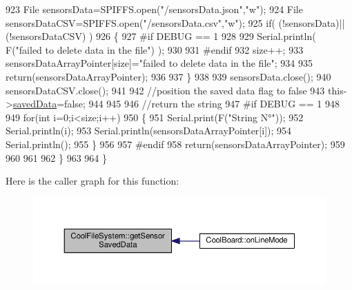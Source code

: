 \begin{DoxyCode}
923         File sensorsData=SPIFFS.open(\textcolor{stringliteral}{"/sensorsData.json"},\textcolor{stringliteral}{"w"});
924         File sensorsDataCSV=SPIFFS.open(\textcolor{stringliteral}{"/sensorsData.csv"},\textcolor{stringliteral}{"w"});
925         \textcolor{keywordflow}{if}( (!sensorsData)||(!sensorsDataCSV) ) 
926         \{
927 \textcolor{preprocessor}{        #if DEBUG == 1}
928     
929             Serial.println( F(\textcolor{stringliteral}{"failed to delete data in the file"}) );
930     
931 \textcolor{preprocessor}{        #endif}
932             size++;
933             sensorsDataArrayPointer[size]=\textcolor{stringliteral}{"failed to delete data in the file"};
934 
935             \textcolor{keywordflow}{return}(sensorsDataArrayPointer);
936 
937         \}
938 
939         sensorsData.close();
940         sensorsDataCSV.close();
941 
942         \textcolor{comment}{//position the saved data flag to false}
943         this->\hyperlink{classCoolFileSystem_ad398e0c5c41a0c88acdf5d672aa71351}{savedData}=\textcolor{keyword}{false}; 
944         
945 
946         \textcolor{comment}{//return the string}
947 \textcolor{preprocessor}{        #if DEBUG == 1}
948         
949             \textcolor{keywordflow}{for}(\textcolor{keywordtype}{int} i=0;i<size;i++)
950             \{
951                 Serial.print(F(\textcolor{stringliteral}{"String N°"}));
952                 Serial.println(i);
953                 Serial.println(sensorsDataArrayPointer[i]);
954                 Serial.println();           
955             \}
956     
957 \textcolor{preprocessor}{        #endif}
958         \textcolor{keywordflow}{return}(sensorsDataArrayPointer);
959         
960         
961         
962     \}
963 
964 \}
\end{DoxyCode}
Here is the caller graph for this function\+:
\nopagebreak
\begin{figure}[H]
\begin{center}
\leavevmode
\includegraphics[width=350pt]{classCoolFileSystem_a3223ffff4266a6300988fab956d6b4b2_icgraph}
\end{center}
\end{figure}
\mbox{\label{classCoolFileSystem_a5a7eaeea7a9fbf8aaef651d862fa3b5b}} 
